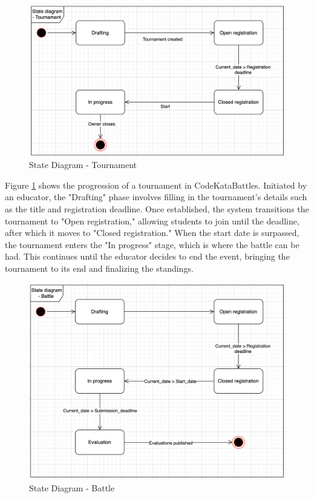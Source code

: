 \begin{figure}[htbp]
    \centering
    \includegraphics[width=\textwidth]{Graphics/State Diagram/Tournament.png}
    \caption{State Diagram - Tournament}
    \label{fig:TStateDiagram}
\end{figure}
Figure \ref{fig:TStateDiagram} shows the progression of a tournament in CodeKataBattles. Initiated by an educator, the "Drafting" phase involves filling in the tournament's details such as the title and registration deadline. Once established, the system transitions the tournament to "Open registration," allowing students to join until the deadline, after which it moves to "Closed registration." When the start date is surpassed, the tournament enters the "In progress" stage, which is where the battle can be had. This continues until the educator decides to end the event, bringing the tournament to its end and finalizing the standings.
\begin{figure}[htbp]
    \centering
    \includegraphics[width=\textwidth]{Graphics/State Diagram/Battle.png}
    \caption{State Diagram - Battle}
    \label{fig:BStateDiagram}
\end{figure}

